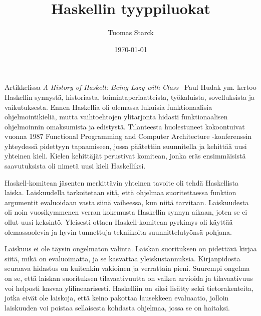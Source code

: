 \documentclass[finnish]{tktltiki2}
\title{Haskellin tyyppiluokat}
\author{Tuomas Starck}
\date{\today}
\begin{document}
\frontmatter

\maketitle
\makeabstract

\tableofcontents

\mainmatter


Artikkelissa \emph{A History of Haskell: Being Lazy with Class}~\cite{Hudak:2007:HHL:1238844.1238856} Paul Hudak ym. kertoo Haskellin synnystä, historiasta, toimintaperiaatteista, työkaluista, sovelluksista ja vaikutuksesta. Ennen Haskellia oli olemassa lukuisia funktionaalisia ohjelmointikieliä, mutta vaihtoehtojen ylitarjonta hidasti funktionaalisen ohjelmoinnin omaksumista ja edistystä. Tilanteesta huolestuneet kokoontuivat vuonna 1987 Functional Programming and Computer Architecture -konferenssin yhteydessä pidettyyn tapaamiseen, jossa päätettiin suunnitella ja kehittää uusi yhteinen kieli. Kielen kehittäjät perustivat komitean, jonka eräs ensimmäisistä saavutuksista oli nimetä uusi kieli Haskelliksi.



Haskell-komitean jäsenten merkittävin yhteinen tavoite oli tehdä Haskellista laiska. Laiskuudella tarkoitetaan sitä, että ohjelmaa suoritettaessa funktion argumentit evaluoidaan vasta siinä vaiheessa, kun niitä tarvitaan. Laiskuudesta oli noin vuosikymmenen verran kokemusta Haskellin synnyn aikaan, joten se ei ollut uusi keksintö. Yleisesti ottaen Haskell-komitean pyrkimys oli käyttää olemassaolevia ja hyvin tunnettuja tekniikoita suunnittelutyönsä pohjana.

Laiskuus ei ole täysin ongelmaton valinta. Laiskan suorituksen on pidettävä kirjaa siitä, mikä on evaluoimatta, ja se kasvattaa yleiskustannuksia. Kirjanpidosta seuraava hidastus on kuitenkin vakioinen ja verrattain pieni. Suurempi ongelma on se, että laiskan suorituksen tilavaativuutta on vaikea arvioida ja tilavaativuus voi helposti kasvaa ylilineaarisesti. Haskelliin on siksi lisätty sekä tietorakenteita, jotka eivät ole laiskoja, että keino pakottaa lausekkeen evaluaatio, jolloin laiskuuden voi poistaa sellaisesta kohdasta ohjelmaa, jossa se on haitaksi.
\end{document}
